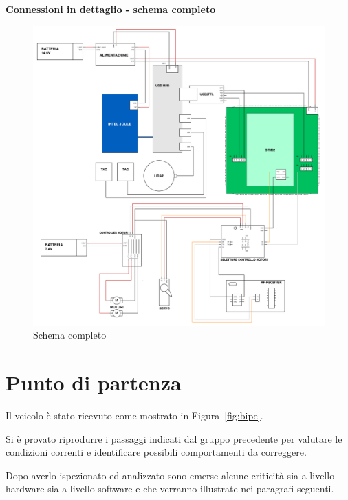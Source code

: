 \clearpage

\null
\vfill
\textbf{Connessioni in dettaglio - schema completo}
\bigskip
\begin{figure}[h] 
\centering    
\includegraphics[width=1\textwidth]{Capitolo1/Figs/schema_luca.pdf}
\caption[Schema completo]{Schema completo}
\label{fig:schema_completo}
\end{figure}

\vfill

\clearpage

\section{Punto di partenza}
\label{section1.2}
Il veicolo è stato ricevuto come mostrato in Figura~\ref{fig:bipe}.

\noindent Si è provato  riprodurre i passaggi indicati dal gruppo precedente per valutare le condizioni correnti e identificare possibili comportamenti da correggere. 

Dopo averlo ispezionato ed analizzato sono emerse alcune criticità sia a livello hardware sia a livello software e che verranno illustrate nei paragrafi seguenti.

